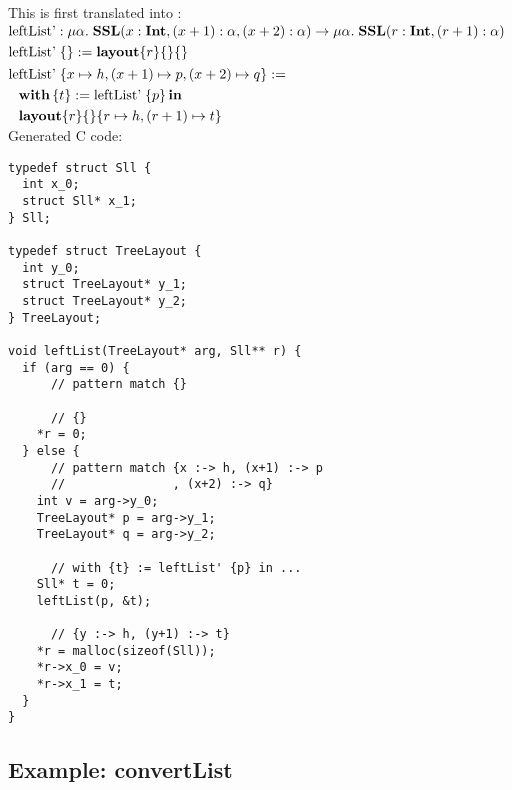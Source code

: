 \noindent
This is first translated into \PikaCore:
\\

$\begin{aligned}
  &\textrm{leftList'} : \mu\alpha.\;\textbf{SSL}(x : \textbf{Int}, (x+1) : \alpha, (x+2) : \alpha) \rightarrow \mu\alpha.\;\textbf{SSL}(r : \textbf{Int}, (r+1) : \alpha)\\
  &\textrm{leftList'}\; \{\} := \textbf{layout}\{ r \}\{  \}\{  \}\\
  &\begin{aligned}
    \textrm{le}&\textrm{ftList'}\; \{x \mapsto h, (x+1) \mapsto p, (x+2) \mapsto q\} :=\\
      &\textbf{with}\,\{t\} := \textrm{leftList'}\; \{p\}\,\textbf{in}\,\\
      &\textbf{layout}\{ r \}\{  \}\{ r \mapsto h, (r+1) \mapsto t \}
   \end{aligned}
\end{aligned}$
\\


\noindent
Generated C code:

\begin{lstlisting}
typedef struct Sll {
  int x_0;
  struct Sll* x_1;
} Sll;

typedef struct TreeLayout {
  int y_0;
  struct TreeLayout* y_1;
  struct TreeLayout* y_2;
} TreeLayout;

void leftList(TreeLayout* arg, Sll** r) {
  if (arg == 0) {
      // pattern match {}

      // {}
    *r = 0;
  } else {
      // pattern match {x :-> h, (x+1) :-> p
      //               , (x+2) :-> q}
    int v = arg->y_0;
    TreeLayout* p = arg->y_1;
    TreeLayout* q = arg->y_2;

      // with {t} := leftList' {p} in ...
    Sll* t = 0;
    leftList(p, &t);

      // {y :-> h, (y+1) :-> t}
    *r = malloc(sizeof(Sll));
    *r->x_0 = v;
    *r->x_1 = t;
  }
}
\end{lstlisting}


\subsection{Example: convertList}

